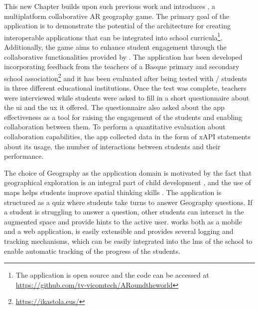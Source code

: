 
This new Chapter builds upon such previous work and introduces \appname{}, a multiplatform collaborative AR geography game.
The primary goal of the application is to demonstrate the potential of the \arch{} architecture for creating interoperable applications that can be integrated into school curricula\footnote{The application is open source and the code can be accessed at \url{https://github.com/tv-vicomtech/ARoundtheworld}}.
Additionally, the game aims to enhance student engagement through the collaborative functionalities provided by \arch{}.
The application has been developed incorporating feedback from the teachers of a Basque primary and secondary school association\footnote{\url{https://ikastola.eus/}} and it has been evaluated after being tested with \numstudents/ students in three different educational institutions.
Once the test was complete, teachers were interviewed while students were asked to fill in a short questionnaire about the \appname{} \gls{ui} and the \gls{ux} it offered. The questionnaire also asked about the app effectiveness as a tool for raising the engagement of the students and enabling collaboration between them.
To perform a quantitative evaluation about \appname{} collaboration capabilities, the app collected data \textendash{} in the form of xAPI statements \citep{xAPIspec} \textendash{} about its usage, the number of interactions between students and their performance.

The choice of Geography as the application domain is motivated by the fact that geographical exploration is an integral part of child development \citep{catling1993whole}, and the use of maps helps students improve spatial thinking skills \citep{collins2018impact}.
The application is structured as a quiz where students take turns to answer Geography questions.
If a student is struggling to answer a question, other students can interact in the augmented space and provide hints to the active user.
\appname{} works both as a mobile and a web application, is easily extensible and provides several logging and tracking mechanisms, which can be easily integrated into the \gls{lms} of the school to enable automatic tracking of the progress of the students.

